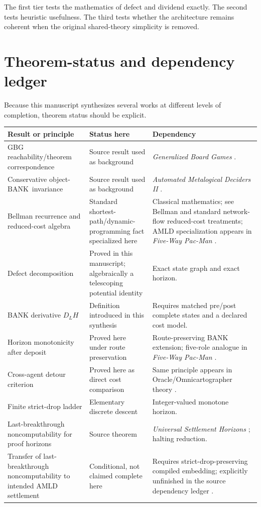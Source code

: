 \documentclass[11pt]{article}
\theoremstyle{remark}
\newcommand{\BANK}{\ensuremath{\mathrm{BANK}}}
\begin{document}
The first tier tests the mathematics of defect and dividend exactly. The second tests heuristic usefulness. The third tests whether the architecture remains coherent when the original shared-theory simplicity is removed.

\section{Theorem-status and dependency ledger}

Because this manuscript synthesizes several works at different levels of completion, theorem status should be explicit.

\begin{longtable}{p{} p{} p{}}
\toprule
\textbf{Result or principle} & \textbf{Status here} & \textbf{Dependency}\\
\midrule
\endhead
GBG reachability/theorem correspondence & Source result used as background & \emph{Generalized Board Games} \cite{TennesonGBG}.\\
\addlinespace
Conservative object-\BANK\ invariance & Source result used as background & \emph{Automated Metalogical Deciders II} \cite{TennesonAMLDII}.\\
\addlinespace
Bellman recurrence and reduced-cost algebra & Standard shortest-path/dynamic-programming fact specialized here & Classical mathematics; see Bellman and standard network-flow reduced-cost treatments; AMLD specialization appears in \emph{Five-Way Pac-Man} \cite{Bellman1957,Ahuja1993,TennesonPacMan}.\\
\addlinespace
Defect decomposition & Proved in this manuscript; algebraically a telescoping potential identity & Exact state graph and exact horizon.\\
\addlinespace
BANK derivative $D_LH$ & Definition introduced in this synthesis & Requires matched pre/post complete states and a declared cost model.\\
\addlinespace
Horizon monotonicity after deposit & Proved here under route preservation & Route-preserving BANK extension; five-role analogue in \emph{Five-Way Pac-Man} \cite{TennesonPacMan}.\\
\addlinespace
Cross-agent detour criterion & Proved here as direct cost comparison & Same principle appears in Oracle/Omnicartographer theory \cite{TennesonOracle}.\\
\addlinespace
Finite strict-drop ladder & Elementary discrete descent & Integer-valued monotone horizon.\\
\addlinespace
Last-breakthrough noncomputability for proof horizons & Source theorem & \emph{Universal Settlement Horizons} \cite{TennesonUSH}; halting reduction.\\
\addlinespace
Transfer of last-breakthrough noncomputability to intended AMLD settlement & Conditional, not claimed complete here & Requires strict-drop-preserving compiled embedding; explicitly unfinished in the source dependency ledger \cite{TennesonUSH}.\\
\bottomrule
\end{longtable}
\end{document}
